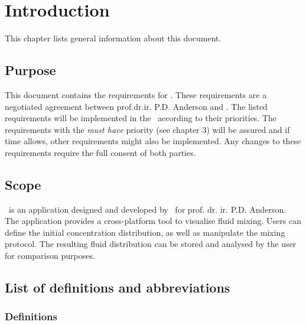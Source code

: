 \chapter{Introduction}
This chapter lists general information about this document.

\section{Purpose}
This document contains the requirements for \projectname. These requirements are a negotiated agreement between prof.dr.ir. P.D. Anderson and \projectauthor. The listed requirements will be implemented in the \applicationname\ according to their priorities. The requirements with the \emph{must have} priority (see chapter 3) will be assured and if time allows, other requirements might also be implemented. Any changes to these requirements require the full consent of both parties.

\section{Scope}
\projectname\ is an application designed and developed by \projectauthor\ for prof. dr. ir. P.D. Anderson. The application provides a cross-platform tool to visualise fluid mixing. Users can define the initial concentration distribution, as well as manipulate the mixing protocol. The resulting fluid distribution can be stored and analysed by the user for comparison purposes. \\


\section{List of definitions and abbreviations}
\subsection{Definitions}

